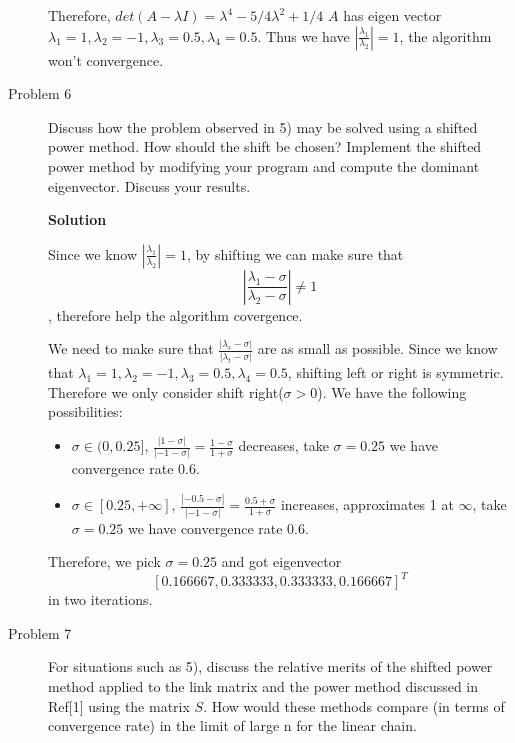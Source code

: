\documentclass{article}
\begin{document}
\begin{description}
	      Therefore, $det(A - \lambda I) = \lambda^4 - 5/4 \lambda^2 + 1/4$
	      $A$ has eigen vector $\lambda_1 = 1, \lambda_2 = -1, \lambda_3 = 0.5, \lambda_4 = 0.5$.
	      Thus we have $|\frac{\lambda_1}{\lambda_2}| = 1$, the algorithm won't convergence.



	\item[Problem 6] Discuss how the problem observed in 5) may be solved using a shifted power method.
	      How should the shift be chosen?
	      Implement the shifted power method by modifying your program and compute the dominant eigenvector.
	      Discuss your results.

	      \textbf{Solution}

	      Since we know $|\frac{\lambda_1}{\lambda_2}| = 1$, by shifting we can make sure that
	      $$|\frac{\lambda_1 - \sigma}{\lambda_2 - \sigma}| \ne 1$$, therefore help the algorithm covergence.

	      We need to make sure that $\frac{|\lambda_s - \sigma|}{|\lambda_t - \sigma|}$ are as small as possible.
	      Since we know that $\lambda_1 = 1, \lambda_2 = -1, \lambda_3 = 0.5, \lambda_4 = 0.5$, shifting left or right is symmetric.
	      Therefore we only consider shift right($\sigma > 0$).
	      We have the following possibilities:

	      \begin{itemize}
		      \item $\sigma \in (0, 0.25]$, $\frac{|1 - \sigma|}{|-1 - \sigma|} = \frac{1 - \sigma}{1 + \sigma}$ decreases, take $\sigma = 0.25$ we have convergence rate 0.6.
		      \item $\sigma \in [0.25, +\infty]$, $\frac{|-0.5 - \sigma|}{|-1 - \sigma|} = \frac{0.5+\sigma}{1 + \sigma}$ increases, approximates 1 at $\infty$, take $\sigma = 0.25$ we have convergence rate 0.6.
	      \end{itemize}
	      Therefore, we pick $\sigma = 0.25$ and got eigenvector $$[0.166667, 0.333333, 0.333333, 0.166667]^T$$ in two iterations.



	\item[Problem 7] For situations such as 5),
	      discuss the relative merits of the shifted power method applied to the link matrix and the power method discussed in Ref[1] using the matrix $S$.
	      How would these methods compare (in terms of convergence rate) in the limit of large n for the linear chain.


\end{description}
\end{document}
